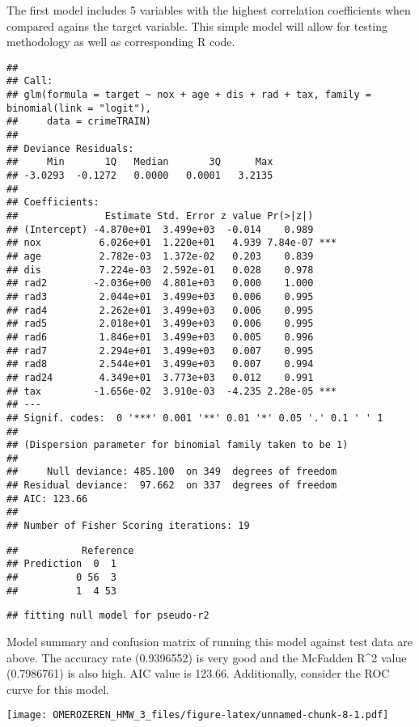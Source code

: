 \documentclass[]{article}
\begin{document}
The first model includes 5 variables with the highest correlation
coefficients when compared agains the target variable. This simple model
will allow for testing methodology as well as corresponding R code.

\begin{verbatim}
## 
## Call:
## glm(formula = target ~ nox + age + dis + rad + tax, family = binomial(link = "logit"), 
##     data = crimeTRAIN)
## 
## Deviance Residuals: 
##     Min       1Q   Median       3Q      Max  
## -3.0293  -0.1272   0.0000   0.0001   3.2135  
## 
## Coefficients:
##               Estimate Std. Error z value Pr(>|z|)    
## (Intercept) -4.870e+01  3.499e+03  -0.014    0.989    
## nox          6.026e+01  1.220e+01   4.939 7.84e-07 ***
## age          2.782e-03  1.372e-02   0.203    0.839    
## dis          7.224e-03  2.592e-01   0.028    0.978    
## rad2        -2.036e+00  4.801e+03   0.000    1.000    
## rad3         2.044e+01  3.499e+03   0.006    0.995    
## rad4         2.262e+01  3.499e+03   0.006    0.995    
## rad5         2.018e+01  3.499e+03   0.006    0.995    
## rad6         1.846e+01  3.499e+03   0.005    0.996    
## rad7         2.294e+01  3.499e+03   0.007    0.995    
## rad8         2.544e+01  3.499e+03   0.007    0.994    
## rad24        4.349e+01  3.773e+03   0.012    0.991    
## tax         -1.656e-02  3.910e-03  -4.235 2.28e-05 ***
## ---
## Signif. codes:  0 '***' 0.001 '**' 0.01 '*' 0.05 '.' 0.1 ' ' 1
## 
## (Dispersion parameter for binomial family taken to be 1)
## 
##     Null deviance: 485.100  on 349  degrees of freedom
## Residual deviance:  97.662  on 337  degrees of freedom
## AIC: 123.66
## 
## Number of Fisher Scoring iterations: 19
\end{verbatim}

\begin{verbatim}
##           Reference
## Prediction  0  1
##          0 56  3
##          1  4 53
\end{verbatim}

\begin{verbatim}
## fitting null model for pseudo-r2
\end{verbatim}

Model summary and confusion matrix of running this model against test
data are above. The accuracy rate (0.9396552) is very good and the
McFadden R\^{}2 value (0.7986761) is also high. AIC value is 123.66.
Additionally, consider the ROC curve for this model.

\texttt{[image: OMEROZEREN\_HMW\_3\_files/figure-latex/unnamed-chunk-8-1.pdf]}
\end{document}
